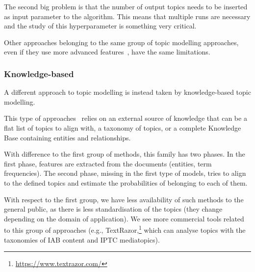 
The second big problem is that the number of output topics needs to be inserted as input parameter to the algorithm. This means that multiple runs are necessary and the study of this hyperparameter is something very critical.

Other approaches belonging to the same group of topic modelling approaches, even if they use more advanced features~\citep{wang2012nonnegative,landauer1998introduction,grootendorst2022bertopic}, have the same limitations.


\subsubsection{Knowledge-based}

A different approach to topic modelling is instead taken by knowledge-based topic modelling.

This type of approaches~\citep{chen2013leveraging,allahyari2017knowledge,xu2018hierarchical,ali2019transportation} relies on an external source of knowledge that can be a flat list of topics to align with, a taxonomy of topics, or a complete Knowledge Base containing entities and relationships.

With difference to the first group of methods, this family has two phases.
In the first phase, features are extracted from the documents (entities, term frequencies).
The second phase, missing in the first type of models, tries to align to the defined topics and estimate the probabilities of belonging to each of them.

With respect to the first group, we have less availability of such methods to the general public, as there is less standardisation of the topics (they change depending on the domain of application).
We see more commercial tools related to this group of approaches (e.g., TextRazor,\footnote{\url{https://www.textrazor.com/}} which can analyse topics with the taxonomies of IAB content and IPTC mediatopics).





